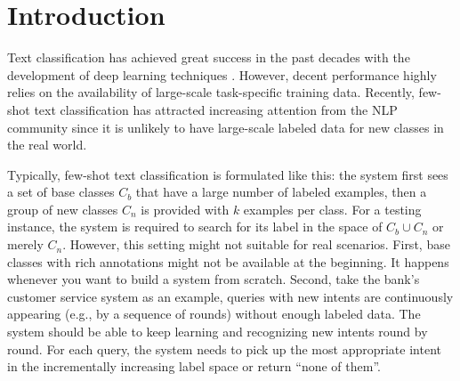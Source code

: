 \documentclass[11pt]{article}
\begin{document}
\section{Introduction}
Text classification has achieved great success in the past decades with the development of deep learning techniques \cite{kowsari2019text, li2020survey}. However, decent performance highly relies on the availability of large-scale task-specific training data. Recently, few-shot text classification \cite{yu2018diverse, geng2019induction, xia2020composed} has attracted increasing attention from the NLP community since it is unlikely to have large-scale labeled data for new classes in the real world. 

Typically, few-shot text classification is formulated like this: the system first sees a set of base classes $C_b$ that have a large number of labeled examples,
then a group of new classes $C_n$ is provided with $k$ examples per class.
For a testing instance, the system is required to search for its label in the space of $C_b\cup C_n$ or merely $C_n$. However, this setting might not suitable for real scenarios. First, base classes with rich annotations might not be available at the beginning. It happens whenever you want to build a system from scratch. Second, take the bank's customer service system as an example, queries with new intents are continuously appearing (e.g., by a sequence of rounds) without enough labeled data. The system should be able to keep learning and recognizing new intents round by round. For each query, the system needs to pick up the most appropriate intent in the incrementally increasing label space or return ``none of them''.
\end{document}
